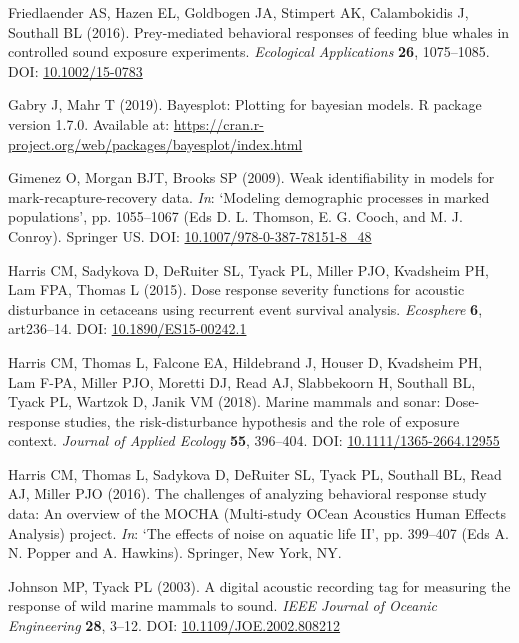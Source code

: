 \documentclass[
]{article}
\begin{document}
\leavevmode\hypertarget{ref-Friedlaender2016}{}%
Friedlaender AS, Hazen EL, Goldbogen JA, Stimpert AK, Calambokidis J, Southall BL (2016). Prey-mediated behavioral responses of feeding blue whales in controlled sound exposure experiments. \emph{Ecological Applications} \textbf{26}, 1075--1085. DOI: \href{https://doi.org/10.1002/15-0783}{10.1002/15-0783}

\leavevmode\hypertarget{ref-Gabry2019}{}%
Gabry J, Mahr T (2019). Bayesplot: Plotting for bayesian models. R package version 1.7.0. Available at: \url{https://cran.r-project.org/web/packages/bayesplot/index.html}

\leavevmode\hypertarget{ref-Gimenez2009}{}%
Gimenez O, Morgan BJT, Brooks SP (2009). Weak identifiability in models for mark-recapture-recovery data. \emph{In}: `Modeling demographic processes in marked populations', pp. 1055--1067 (Eds D. L. Thomson, E. G. Cooch, and M. J. Conroy). Springer US. DOI: \href{https://doi.org/10.1007/978-0-387-78151-8_48}{10.1007/978-0-387-78151-8\_48}

\leavevmode\hypertarget{ref-Harris2015}{}%
Harris CM, Sadykova D, DeRuiter SL, Tyack PL, Miller PJO, Kvadsheim PH, Lam FPA, Thomas L (2015). Dose response severity functions for acoustic disturbance in cetaceans using recurrent event survival analysis. \emph{Ecosphere} \textbf{6}, art236--14. DOI: \href{https://doi.org/10.1890/ES15-00242.1}{10.1890/ES15-00242.1}

\leavevmode\hypertarget{ref-Harris2018}{}%
Harris CM, Thomas L, Falcone EA, Hildebrand J, Houser D, Kvadsheim PH, Lam F-PA, Miller PJO, Moretti DJ, Read AJ, Slabbekoorn H, Southall BL, Tyack PL, Wartzok D, Janik VM (2018). Marine mammals and sonar: Dose-response studies, the risk-disturbance hypothesis and the role of exposure context. \emph{Journal of Applied Ecology} \textbf{55}, 396--404. DOI: \href{https://doi.org/10.1111/1365-2664.12955}{10.1111/1365-2664.12955}

\leavevmode\hypertarget{ref-Harris2016}{}%
Harris CM, Thomas L, Sadykova D, DeRuiter SL, Tyack PL, Southall BL, Read AJ, Miller PJO (2016). The challenges of analyzing behavioral response study data: An overview of the MOCHA (Multi-study OCean Acoustics Human Effects Analysis) project. \emph{In}: `The effects of noise on aquatic life II', pp. 399--407 (Eds A. N. Popper and A. Hawkins). Springer, New York, NY.

\leavevmode\hypertarget{ref-Johnson2003}{}%
Johnson MP, Tyack PL (2003). A digital acoustic recording tag for measuring the response of wild marine mammals to sound. \emph{IEEE Journal of Oceanic Engineering} \textbf{28}, 3--12. DOI: \href{https://doi.org/10.1109/JOE.2002.808212}{10.1109/JOE.2002.808212}
\end{document}
